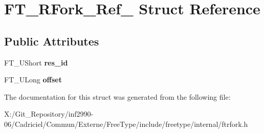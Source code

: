 \hypertarget{struct_f_t___r_fork___ref__}{\section{F\-T\-\_\-\-R\-Fork\-\_\-\-Ref\-\_\- Struct Reference}
\label{struct_f_t___r_fork___ref__}
}
\subsection*{Public Attributes}
\begin{DoxyCompactItemize}
\item 
\hypertarget{struct_f_t___r_fork___ref___a7bca14bddf56df7903166b52e19a0500}{F\-T\-\_\-\-U\-Short {\bfseries res\-\_\-id}}\label{struct_f_t___r_fork___ref___a7bca14bddf56df7903166b52e19a0500}

\item 
\hypertarget{struct_f_t___r_fork___ref___af84c349a29b40c42a788927b113f9ecf}{F\-T\-\_\-\-U\-Long {\bfseries offset}}\label{struct_f_t___r_fork___ref___af84c349a29b40c42a788927b113f9ecf}

\end{DoxyCompactItemize}


The documentation for this struct was generated from the following file\-:\begin{DoxyCompactItemize}
\item 
X\-:/\-Git\-\_\-\-Repository/inf2990-\/06/\-Cadriciel/\-Commun/\-Externe/\-Free\-Type/include/freetype/internal/ftrfork.\-h\end{DoxyCompactItemize}
